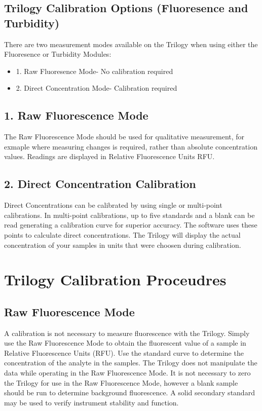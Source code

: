 \documentclass[12pt]{../SOP3_beta}
\begin{document}
\subsection{Trilogy Calibration Options (Fluoresence and Turbidity)}
\NP There are two measurement modes available on the Trilogy when using either the Fluoresence or Turbidity Modules:
\begin{itemize}
  \item 1. Raw Fluoresence Mode- No calibration required
  \item 2. Direct Concentration Mode- Calibration required 
\end{itemize}

\subsection{1. Raw Fluorescence Mode}
\NP The Raw Fluorescence Mode should be used for qualitative measurement, for exmaple where measuring changes is required, rather than absolute concentration values. Readings are displayed in Relative Fluorescence Units RFU.

\subsection{2. Direct Concentration Calibration}
\NP Direct Concentrations can be calibrated by using single or multi-point calibrations. In multi-point calibrations, up to five standards and a blank can be read generating a calibration curve for superior accuracy. The software uses these points to calculate direct concentrations. The Trilogy will display the actual concentration of your samples in units that were choosen during calibration. 

\section{Trilogy Calibration Proceudres}
\subsection{Raw Fluorescence Mode}
\NP A calibration is not necessary to measure fluorescence with the Trilogy. Simply use the Raw Fluorescence Mode to obtain the fluorescent value of a sample in Relative Fluorescence Units (RFU). Use the standard curve to determine the concentration of the analyte in the samples. The Trilogy does not manipulate the data while operating in the Raw Fluorescence Mode. It is not necessary to zero the Trilogy for use in the Raw Fluorescence Mode, however a blank sample should be run to determine background fluorescence. A solid secondary standard may be used to verify instrument stability and function. 
\end{document}
